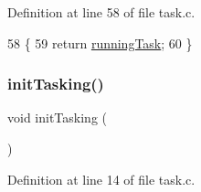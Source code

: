 Definition at line 58 of file task.\+c.


\begin{DoxyCode}
58                         \{
59     \textcolor{keywordflow}{return} \hyperlink{a00047_a2c195d425b4a6791b3a89f7b219f93d9_a2c195d425b4a6791b3a89f7b219f93d9}{runningTask};
60 \}
\end{DoxyCode}
\mbox{\label{a00050_aea945e91746a54801f4763ad264746b9_aea945e91746a54801f4763ad264746b9}} 
\subsubsection{\texorpdfstring{init\+Tasking()}{initTasking()}}
{\footnotesize\ttfamily void init\+Tasking (\begin{DoxyParamCaption}{ }\end{DoxyParamCaption})}



Definition at line 14 of file task.\+c.


